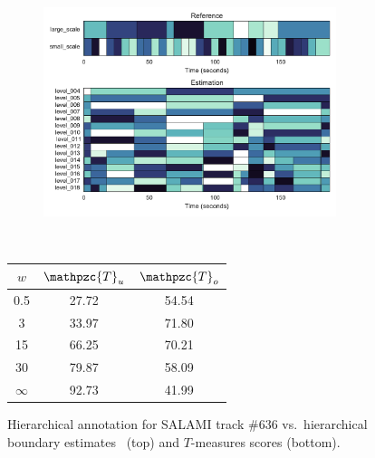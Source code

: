 \documentclass{article}
\def\shag{\ensuremath{\mathpzc{T}}}
\begin{document}
\begin{figure}[t]
  \centering
  \begin{subfigure}{0.5\textwidth}
    \centering
    \includegraphics[width=0.94\textwidth]{figs/SALAMI-OLDA.pdf}
  \end{subfigure}%
  \\
  \begin{minipage}{0.5\textwidth}
    \centering
    \vspace{10pt}
    \begin{tabular}{|c|c|c|}
      \hline
      $w$       & $\shag_u$       & $\shag_o$      \\
      \hline
      0.5       & 27.72       & 54.54      \\     
      3         & 33.97       & 71.80      \\
      15        & 66.25       & 70.21    \\
      30        & 79.87       & 58.09    \\
      $\infty$  & 92.73       & 41.99    \\
      \hline
    \end{tabular}
  \end{minipage}
  \caption{Hierarchical annotation for SALAMI track \#636 vs.\ hierarchical boundary
  estimates~\cite{McFee2014} (top) and $T$-measures scores (bottom).}
  \label{fig:SALAMI-OLDA}
\end{figure}


\end{document}

